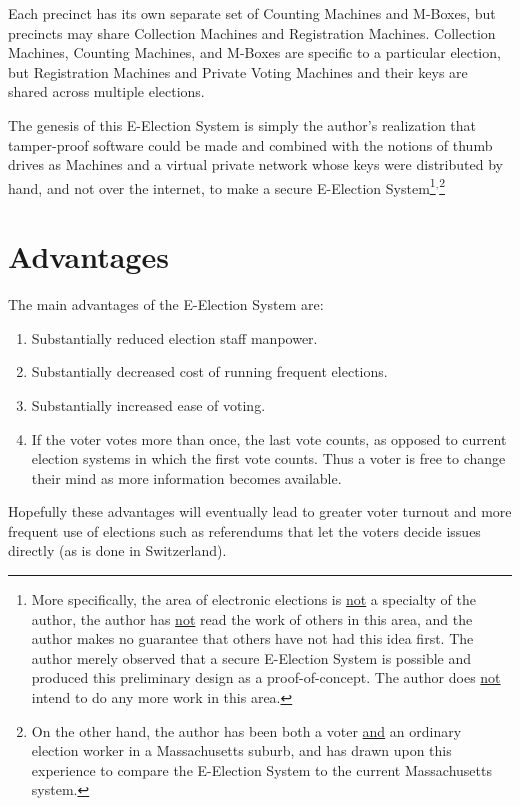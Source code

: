 \documentclass[12pt]{article}
\begin{document}
Each precinct has its own separate set of Counting Machines and M-Boxes,
but precincts may share Collection Machines and Registration
Machines.  Collection Machines,
Counting Machines, and M-Boxes are
specific to a particular election, but Registration Machines
and Private Voting Machines and
their keys are shared across multiple elections.

The genesis of this E-Election System is simply the author's
realization that tamper-proof software could be made and
combined with the notions of thumb drives as Machines and
a virtual private network whose keys were distributed by
hand, and not over the internet, to make a secure E-Election
System\footnote{More specifically, the area of electronic
elections is \underline{not} a specialty of the author, the
author has \underline{not} read the work of others in this
area, and the author makes no guarantee that others have not had
this idea first.  The author merely observed that a secure
E-Election System is possible and produced this preliminary
design as a proof-of-concept.
The author does \underline{not} intend to do any more work in this
area.}$^,$\footnote{On the other hand, the author has been both a voter
\underline{and}
an ordinary election worker in a Massachusetts suburb,
and has drawn upon this experience to compare the E-Election System
to the current Massachusetts system.}

\section{Advantages}

The main advantages of the E-Election System are:
\begin{enumerate}
\item Substantially reduced election staff manpower.
\item Substantially decreased cost of running frequent elections.
\item Substantially increased ease of voting.
\item If the voter votes more than once, the last vote counts,
      as opposed to current election systems in which the first vote counts.
      Thus a voter is free to change their mind as more information
      becomes available.
\end{enumerate}

Hopefully these advantages will eventually lead to
greater voter turnout and more frequent use of elections such
as referendums that let the voters decide issues directly
(as is done in Switzerland).
\end{document}
